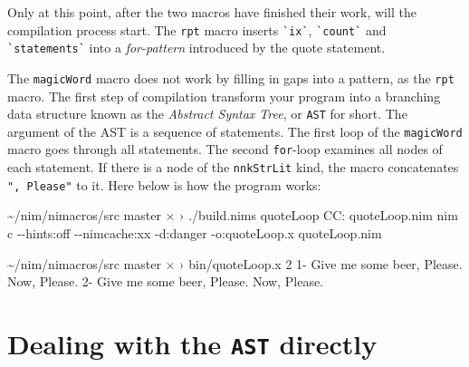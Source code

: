 \documentclass[
  12pt,
]{book}
\newenvironment{Shaded}{}{}
\newcommand{\NormalTok}[1]{#1}
\begin{document}
Only at this point, after the two macros have finished their work, will
the compilation process start. The \texttt{rpt} macro inserts
\verb|`ix`|, \verb|`count`| and \verb|`statements`| into a
\emph{for-pattern} introduced by the quote statement.

The \texttt{magicWord} macro does not work by filling in gaps into a
pattern, as the \texttt{rpt} macro. The first step of compilation
transform your program into a branching data structure known as the
\emph{Abstract Syntax Tree}, or \texttt{AST} for short. The argument of
the AST is a sequence of statements. The first loop of the
\texttt{magicWord} macro goes through all statements. The second
\texttt{for}-loop examines all nodes of each statement. If there is a
node of the \texttt{nnkStrLit} kind, the macro concatenates
\texttt{",\ Please"} to it. Here below is how the program works:

\begin{Shaded}
\begin{Highlighting}[]
\NormalTok{\textasciitilde{}/nim/nimacros/src master ×}
\NormalTok{› ./build.nims quoteLoop}
\NormalTok{CC: quoteLoop.nim}
\NormalTok{nim c {-}{-}hints:off {-}{-}nimcache:xx {-}d:danger {-}o:quoteLoop.x quoteLoop.nim}

\NormalTok{\textasciitilde{}/nim/nimacros/src master ×}
\NormalTok{› bin/quoteLoop.x 2}
\NormalTok{1{-} Give me some beer, Please.}
\NormalTok{Now, Please.}
\NormalTok{2{-} Give me some beer, Please.}
\NormalTok{Now, Please.}
\end{Highlighting}
\end{Shaded}

\section{\texorpdfstring{Dealing with the \texttt{AST}
directly}{Dealing with the AST directly}}\label{dealing-with-the-ast-directly}
\end{document}
